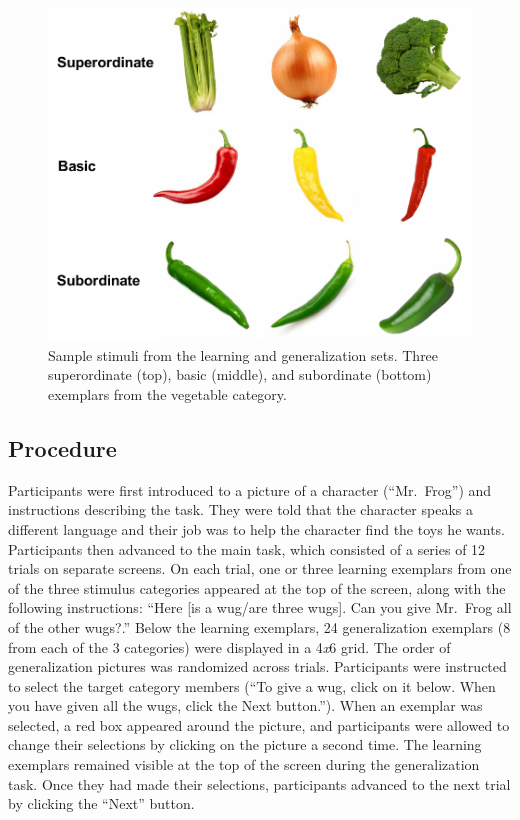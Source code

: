 \documentclass[english,floatsintext,man]{apa6}
\theoremstyle{definition}
\theoremstyle{definition}
\theoremstyle{remark}
\begin{document}
\begin{figure}[t!]

{\centering \includegraphics[width=0.5\linewidth]{figs/stim} 

}

\caption{Sample stimuli from the learning and generalization sets. Three superordinate (top), basic (middle), and subordinate (bottom) exemplars from the vegetable category.}\label{fig:unnamed-chunk-1}
\end{figure}

\subsection{Procedure}\label{procedure}

Participants were first introduced to a picture of a character
(\enquote{Mr.~Frog}) and instructions describing the task. They were
told that the character speaks a different language and their job was to
help the character find the toys he wants. Participants then advanced to
the main task, which consisted of a series of 12 trials on separate
screens. On each trial, one or three learning exemplars from one of the
three stimulus categories appeared at the top of the screen, along with
the following instructions: \enquote{Here {[}is a wug/are three wugs{]}.
Can you give Mr.~Frog all of the other wugs?.} Below the learning
exemplars, 24 generalization exemplars (8 from each of the 3 categories)
were displayed in a 4\emph{x}6 grid. The order of generalization
pictures was randomized across trials. Participants were instructed to
select the target category members (\enquote{To give a wug, click on it
below. When you have given all the wugs, click the Next button.}). When
an exemplar was selected, a red box appeared around the picture, and
participants were allowed to change their selections by clicking on the
picture a second time. The learning exemplars remained visible at the
top of the screen during the generalization task. Once they had made
their selections, participants advanced to the next trial by clicking
the \enquote{Next} button.
\end{document}
